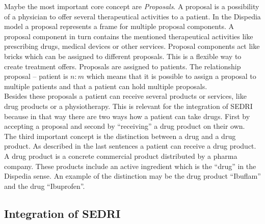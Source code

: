 Maybe the most important core concept are \textit{Proposals}.
A proposal is a possibility of a physician to offer several therapeutical activities to a patient.
In the Dispedia model a proposal represents a frame for multiple proposal components.
A proposal component in turn contains the mentioned therapeutical activities like prescribing drugs, medical devices or other services.
Proposal components act like bricks which can be assigned to different proposals.
This is a flexible way to create treatment offers.
Proposals are assigned to patients.
The relationship proposal -- patient is $n:m$ which means that it is possible to assign a proposal to multiple patients and that a patient can hold multiple proposals.\\
Besides these proposals a patient can receive several products or services, like drug products or a physiotherapy.
This is relevant for the integration of SEDRI because in that way there are two ways how a patient can take drugs.
First by accepting a proposal and second by ``receiving'' a drug product on their own.\\
The third important concept is the distinction between a drug and a drug product.
As described in the last sentences a patient can receive a drug product.
A drug product is a concrete commercial product distributed by a pharma company.
These products include an active ingredient which is the ``drug'' in the Dispedia sense.
An example of the distinction may be the drug product ``Ibuflam'' and the drug ``Ibuprofen''.

\subsection{Integration of SEDRI}
\label{sec:integration-sedri}

